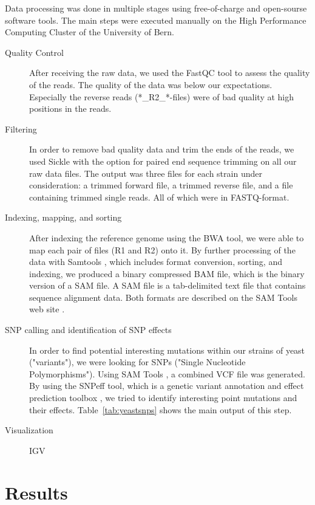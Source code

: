 \documentclass[10pt,a4paper]{article}
\begin{document}
Data processing was done in multiple stages using free-of-charge and open-sourse software tools. The main steps were executed manually on the High Performance Computing Cluster of the University of Bern.

\begin{description}
\item[Quality Control] After receiving the raw data, we used the FastQC \cite{FastQC} tool to assess the quality of the reads. The quality of the data was below our expectations. Especially the reverse reads (*\_R2\_*-files) were of bad quality at high positions in the reads.

\item[Filtering] In order to remove bad quality data and trim the ends of the reads, we used Sickle \cite{sickle} with the option for paired end sequence trimming on all our raw data files. The output was three files for each strain under consideration: a trimmed forward file, a trimmed reverse file, and a file containing trimmed single reads. All of which were in FASTQ-format.

\item[Indexing, mapping, and sorting] After indexing the reference genome using the BWA \cite{BWA} tool, we were able to map each pair of files (R1 and R2) onto it. By further processing of the data with Samtools \cite{SAMtools}, which includes format conversion, sorting, and indexing, we produced a binary compressed BAM file, which is the binary version of a SAM file. A SAM file is a tab-delimited text file that contains sequence alignment data. Both formats are described on the SAM Tools web site \cite{SAMtools}.

\item[SNP calling and identification of SNP effects] In order to find potential interesting mutations within our strains of yeast ("variants"), we were looking for SNPs ("Single Nucleotide Polymorphisms"). Using SAM Tools \cite{SAMtools}, a combined VCF file was generated. By using the SNPeff tool, which is a genetic variant annotation and effect prediction toolbox \cite{cingolani2012program}, we tried to identify interesting point mutations and their effects. Table~\ref*{tab:yeastsnps} shows the main output of this step.

\item[Visualization] IGV

\end{description}

\section{Results}
\end{document}

